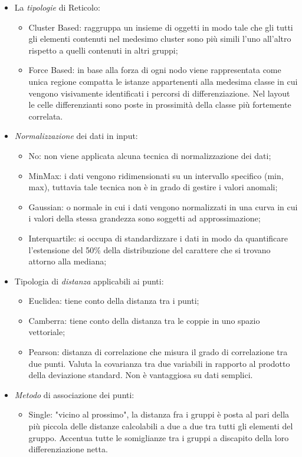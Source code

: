 \begin{itemize}
\item La \textit{tipologie} di Reticolo:
\begin{itemize}
\item Cluster Based: raggruppa un insieme di oggetti in modo tale che gli tutti gli elementi contenuti nel medesimo cluster sono pi\`u simili l'uno all'altro rispetto a quelli contenuti in altri gruppi;
\item Force Based: in base alla forza di ogni nodo viene rappresentata come unica regione compatta le istanze appartenenti alla medesima classe in cui vengono visivamente identificati i percorsi di differenziazione. Nel layout le celle differenzianti sono poste in prossimit\`a della classe pi\`u fortemente correlata.
\end{itemize}
\item \textit{Normalizzazione} dei dati in input:
\begin{itemize}
\item No: non viene applicata alcuna tecnica di normalizzazione dei dati;
\item MinMax: i dati vengono ridimensionati su un intervallo specifico (min, max), tuttavia tale tecnica non \`e in grado di gestire i valori anomali;
\item Gaussian: o normale in cui i dati vengono normalizzati in una curva in cui i valori della stessa grandezza sono soggetti ad approssimazione;
\item Interquartile: si occupa di standardizzare i dati in modo da quantificare l'estensione del 50\% della distribuzione del carattere che si trovano attorno alla mediana;
\end{itemize}
\item Tipologia di \textit{distanza} applicabili ai punti:
\begin{itemize}
\item Euclidea: tiene conto della distanza tra i punti;
\item Camberra: tiene conto della distanza tra le coppie in uno spazio vettoriale;
\item Pearson: distanza di correlazione che misura il grado di correlazione tra due punti. Valuta la covarianza tra due variabili in rapporto al prodotto della deviazione standard. Non \`e vantaggiosa su dati semplici.
\end{itemize}
\item \textit{Metodo} di associazione dei punti:
\begin{itemize}
\item Single: "vicino al prossimo", la distanza fra i gruppi \`e posta al pari della pi\`u piccola delle distanze calcolabili a due a due tra tutti gli elementi del gruppo. Accentua tutte le somiglianze tra i gruppi a discapito  della loro differenziazione netta.

\end{itemize}
\end{itemize}
